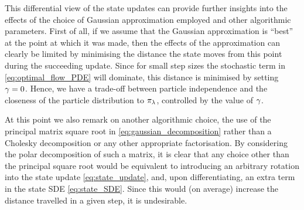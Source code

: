 \documentclass{article}
\begin{document}
This differential view of the state updates can provide further insights into the effects of the choice of Gaussian approximation employed and other algorithmic parameters. First of all, if we assume that the Gaussian approximation is ``best'' at the point at which it was made, then the effects of the approximation can clearly be limited by minimising the distance the state moves from this point during the succeeding update. Since for small step sizes the stochastic term in \eqref{eq:optimal_flow_PDE} will dominate, this distance is minimised by setting $\gamma=0$. Hence, we have a trade-off between particle independence and the closeness of the particle distribution to $\pi_{\lambda}$, controlled by the value of $\gamma$.

At this point we also remark on another algorithmic choice, the use of the principal matrix square root in \eqref{eq:gaussian_decomposition} rather than a Cholesky decomposition or any other appropriate factorisation. By considering the polar decomposition of such a matrix, it is clear that any choice other than the principal square root would be equivalent to introducing an arbitrary rotation into the state update \eqref{eq:state_update}, and, upon differentiating, an extra term in the state SDE \eqref{eq:state_SDE}. Since this would (on average) increase the distance travelled in a given step, it is undesirable.
\end{document}

